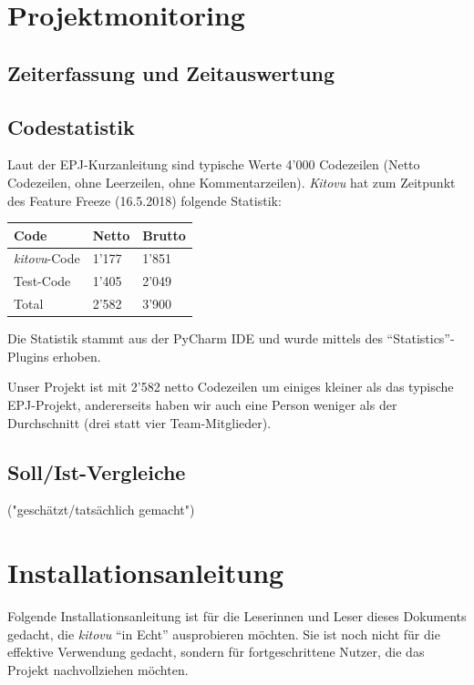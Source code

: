 \documentclass[a4paper]{article}
\let\oldsection\section
\renewcommand\section{\clearpage\oldsection}
\begin{document}
\section{Projektmonitoring}

\subsection{Zeiterfassung und Zeitauswertung}


\subsection{Codestatistik}

Laut der EPJ-Kurzanleitung sind typische Werte 4'000 Codezeilen (Netto Codezeilen, ohne Leerzeilen, ohne Kommentarzeilen). \emph{Kitovu} hat zum Zeitpunkt des Feature Freeze (16.5.2018) folgende Statistik:

{\renewcommand{\arraystretch}{1.5}%
\begin{tabulary}{\linewidth}{l|ll}
  \bfseries Code &
  \bfseries Netto &
  \bfseries Brutto \\
  \midrule

\emph{kitovu}-Code & 1'177 & 1'851 \\ \hline
Test-Code & 1'405 & 2'049 \\ \bottomrule
Total & 2'582 & 3'900 \\
\end{tabulary}
}

Die Statistik stammt aus der PyCharm IDE und wurde mittels des ``Statistics''-Plugins erhoben.

Unser Projekt ist mit 2'582 netto Codezeilen um einiges kleiner als das typische EPJ-Projekt, andererseits haben wir auch eine Person weniger als der Durchschnitt (drei statt vier Team-Mitglieder).

\subsection{Soll/Ist-Vergleiche}

 ("geschätzt/tatsächlich gemacht")


\section{Installationsanleitung}

Folgende Installationsanleitung ist für die Leserinnen und Leser dieses Dokuments gedacht, die \emph{kitovu} ``in Echt'' ausprobieren möchten. Sie ist noch nicht für die effektive Verwendung gedacht, sondern für fortgeschrittene Nutzer, die das Projekt nachvollziehen möchten.
\end{document}
